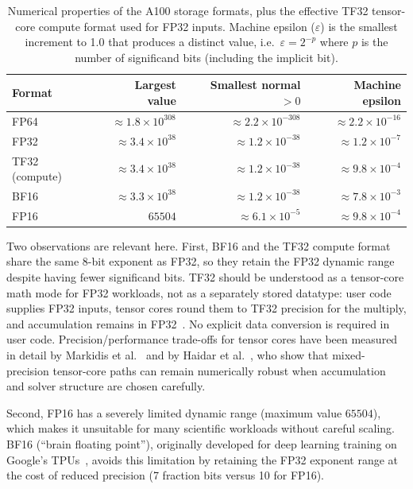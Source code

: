 \begin{table}[H]
\centering
\caption{Numerical properties of the A100 storage formats, plus the effective TF32 tensor-core compute format used for FP32 inputs. Machine epsilon ($\varepsilon$) is the smallest increment to 1.0 that produces a distinct value, i.e.\ $\varepsilon = 2^{-p}$ where $p$ is the number of significand bits (including the implicit bit).}
\label{tab:fp-properties}
\begin{tabularx}{\textwidth}{l r r r}
\toprule
Format & Largest value & Smallest normal $>0$ & Machine epsilon \\
\midrule
FP64  & $\approx 1.8 \times 10^{308}$  & $\approx 2.2 \times 10^{-308}$ & $\approx 2.2 \times 10^{-16}$ \\
FP32  & $\approx 3.4 \times 10^{38}$   & $\approx 1.2 \times 10^{-38}$  & $\approx 1.2 \times 10^{-7}$  \\
TF32 (compute)  & $\approx 3.4 \times 10^{38}$   & $\approx 1.2 \times 10^{-38}$  & $\approx 9.8 \times 10^{-4}$  \\
BF16  & $\approx 3.3 \times 10^{38}$   & $\approx 1.2 \times 10^{-38}$  & $\approx 7.8 \times 10^{-3}$  \\
FP16  & $65504$                         & $\approx 6.1 \times 10^{-5}$   & $\approx 9.8 \times 10^{-4}$  \\
\bottomrule
\end{tabularx}
\end{table}

Two observations are relevant here. First, BF16 and the TF32 compute format
share the same 8-bit exponent as FP32, so they retain the FP32 dynamic range
despite having fewer significand bits. TF32 should be understood as a tensor-core
math mode for FP32 workloads, not as a separately stored datatype: user code
supplies FP32 inputs, tensor cores round them to TF32 precision for the multiply,
and accumulation remains in FP32~\cite{nvidia-tf32,nvidia-ampere-in-depth}. No
explicit data conversion is required in user code. Precision/performance
trade-offs for tensor cores have been measured in detail by Markidis et
al.~\cite{markidis2018tensorcore-precision} and by Haidar et
al.~\cite{haidar2018tensorcore-ir}, who show that mixed-precision tensor-core
paths can remain numerically robust when accumulation and solver structure are
chosen carefully.

Second, FP16 has a severely limited dynamic range (maximum value $65504$), which makes it unsuitable for many scientific workloads without careful scaling. BF16 (``brain floating point''), originally developed for deep learning training on Google's TPUs~\cite{kalamkar2019bfloat16}, avoids this limitation by retaining the FP32 exponent range at the cost of reduced precision (7 fraction bits versus 10 for FP16).


